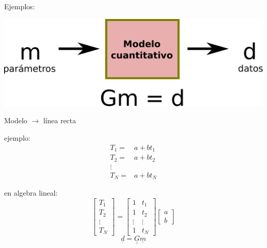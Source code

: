 \documentclass{beamer}
\begin{document}
\begin{frame}
 {Ejemplos:}
 
 \begin{center}
  \includegraphics[width=0.6\linewidth]{images/forward.pdf}  
 \end{center}
 \begin{minipage}{0.45\linewidth}
 \begin{center}
  Modelo $\rightarrow$ línea recta \\
 \end{center}
 ejemplo:
 \begin{align*}
  T_1 = & a + bt_1 \\
  T_2 = & a + bt_2 \\
  \vdots \\
  T_N = & a  + bt_N
 \end{align*}
 \end{minipage}
 \begin{minipage}{0.45\linewidth}
 en algebra lineal:
  \begin{equation*}
   \begin{bmatrix}
    T_1 \\
    T_2 \\
    \vdots \\
    T_N
   \end{bmatrix}
   = 
   \begin{bmatrix}
    1 & t_1 \\
    1 & t_2 \\
    \vdots & \vdots \\
    1 & t_N
   \end{bmatrix}
   \begin{bmatrix}
   a \\
   b
   \end{bmatrix}
 \end{equation*} 
  \begin{equation*}
  \underline{d} = \underline{\underline{G}} \underline{m}
 \end{equation*} 
 \end{minipage}
 
\end{frame}
\end{document}
